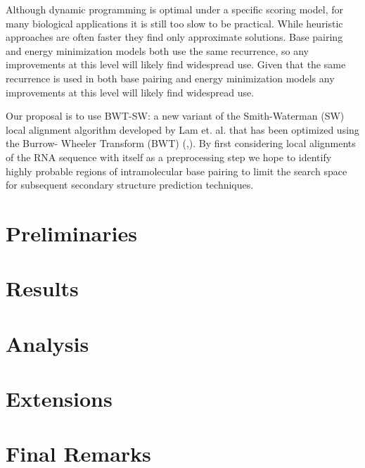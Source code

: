 \documentclass[11pt]{article}
\begin{document}
Although dynamic programming is optimal under a specific scoring model, for many biological applications it is still too slow to be practical. While heuristic approaches are often faster they find only approximate solutions. Base pairing and energy minimization models both use the same recurrence, so any improvements at this level will likely find widespread use. 
 Given that the same recurrence is used in both base pairing and energy minimization models any improvements at this level will likely find widespread use.

Our proposal is to use BWT-SW: a new variant of the Smith-Waterman (SW) local 
alignment algorithm developed by Lam et. al. \cite{four} that has been optimized using the Burrow- Wheeler Transform (BWT) (\cite{six},\cite{seven}). By first considering local alignments of the RNA sequence with itself as a preprocessing step we hope to identify highly probable regions of intramolecular base pairing to limit the search space for subsequent secondary structure prediction techniques.

\section{Preliminaries}

\section{Results}

\section{Analysis}

\section{Extensions}

\section{Final Remarks}



\end{document}
